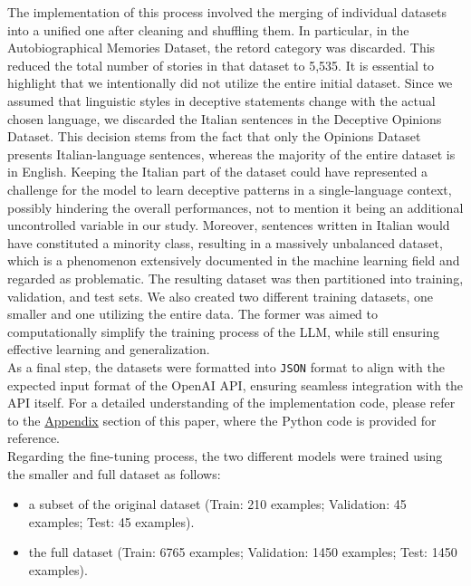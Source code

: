 \documentclass[10pt,twocolumn,letterpaper]{article}
\begin{document}
The implementation of this process involved the merging of individual datasets into a unified one after cleaning and shuffling them. 
In particular, in the Autobiographical Memories Dataset, the retord category was discarded. This reduced the total number of stories in that dataset to 5,535.
It is essential to highlight that we intentionally did not utilize the entire initial dataset. Since we assumed that linguistic styles in deceptive statements change 
with the actual chosen language, we discarded the Italian sentences in the Deceptive Opinions Dataset.
This decision stems from the fact that only the Opinions Dataset presents Italian-language sentences, whereas the majority of the entire dataset is in English. Keeping the Italian part of the dataset could have represented
a challenge for the model to learn deceptive patterns in a single-language context, possibly hindering the overall performances, not to mention it being an additional
uncontrolled variable in our study. Moreover, sentences written in Italian would have constituted a minority class, resulting in a massively unbalanced dataset,
which is a phenomenon extensively documented in the machine learning field and regarded as problematic. 
The resulting dataset was then partitioned into training, validation, and test sets.
We also created two different training datasets, one smaller and one utilizing the entire data. The former was aimed to computationally simplify the training process of the LLM, 
while still ensuring effective learning and generalization. \\

As a final step, the datasets were formatted into \texttt{JSON} format to align with the expected input format of the OpenAI API, ensuring seamless integration with the API itself. 
For a detailed understanding of the implementation code, please refer to the \hyperref[sec:appendix]{Appendix} section of this paper, where the Python code is provided for reference.\\

Regarding the fine-tuning process, the two different models were trained using the smaller and full dataset as follows:

\begin{itemize}
    \item a subset of the original dataset (Train: 210 examples; Validation: 45 examples; Test: 45 examples).
    \item the full dataset (Train: 6765 examples; Validation: 1450 examples; Test: 1450 examples).
\end{itemize} \\
\end{document}
